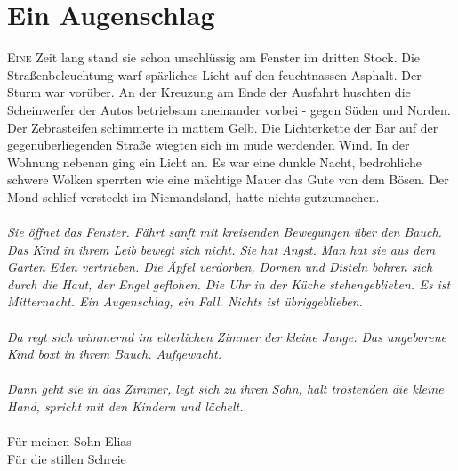 \chapter{Ein Augenschlag}

\lettrine{E}{ine} Zeit lang stand sie schon unschlüssig am Fenster im dritten Stock. Die Straßenbeleuchtung warf spärliches Licht auf den feuchtnassen Asphalt. Der Sturm war vorüber. An der Kreuzung am Ende der Ausfahrt huschten die Scheinwerfer der Autos betriebsam aneinander vorbei - gegen Süden und Norden. Der Zebrasteifen schimmerte in mattem Gelb. Die Lichterkette der Bar auf der gegenüberliegenden Straße wiegten sich im müde werdenden Wind. In der Wohnung nebenan ging ein Licht an. Es war eine dunkle Nacht, bedrohliche schwere Wolken sperrten wie eine mächtige Mauer das Gute von dem Bösen. Der Mond schlief versteckt im Niemandsland, hatte nichts gutzumachen. \\\\
\textit{Sie öffnet das Fenster. Fährt sanft mit kreisenden Bewegungen über den Bauch. Das Kind in ihrem Leib bewegt sich nicht. Sie hat Angst. Man hat sie aus dem Garten Eden vertrieben. Die Äpfel verdorben, Dornen und Disteln bohren sich durch die Haut, der Engel geflohen. Die Uhr in der Küche stehengeblieben. Es ist Mitternacht. Ein Augenschlag, ein Fall. Nichts ist übriggeblieben.\\\\
Da regt sich wimmernd im elterlichen Zimmer der kleine Junge. Das ungeborene Kind boxt in ihrem Bauch. Aufgewacht.\\\\
Dann geht sie in das Zimmer, legt sich zu ihren Sohn, hält tröstenden die kleine Hand, spricht mit den Kindern und lächelt. }\\\\

Für meinen Sohn Elias\\
Für die stillen Schreie